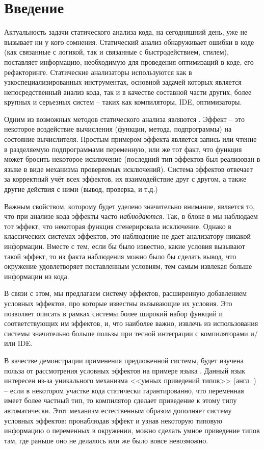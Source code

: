 \section*{Введение}

Актуальность задачи статического анализа кода, на сегодняшний день, уже не вызывает ни у кого сомнения. Статический анализ обнаруживает ошибки в коде (как связанные с логикой, так и связанные с быстродействием, стилем), поставляет информацию, необходимую для проведения оптимизаций в коде, его рефакторинге. Статические анализаторы используются как в узкоспециализированных инструментах, основной задачей которых является непосредственный анализ кода, так и в качестве составной части других, более крупных и серьезных систем -- таких как компиляторы, IDE, оптимизаторы.

Одним из возможных методов статического анализа являются . Эффект -- это некоторое воздействие вычисления (функции, метода, подпрограммы) на состояние вычислителя. Простым примером эффекта является запись или чтение в разделяемую подпрограммами переменную, или же тот факт, что функция может бросить некоторое исключение (последний тип эффектов был реализован в языке  в виде механизма проверяемых исключений). Система эффектов отвечает за корректный учёт всех эффектов, их взаимодействие друг с другом, а также другие действия с ними (вывод, проверка, и т.д.)

Важным свойством, которому будет уделено значительно внимание, является то, что при анализе кода эффекты часто \textit{наблюдаются}. Так, в блоке  в  мы наблюдаем тот эффект, что некоторая функция сгенерировала исключение. Однако в классических системах эффектов, это наблюдение не дает анализатору никакой информации. Вместе с тем, если бы было известно, какие условия вызывают такой эффект, то из факта наблюдения можно было бы сделать вывод, что окружение удовлетворяет поставленным условиям, тем самым извлекая больше информации из кода. 

В связи с этом, мы предлагаем систему эффектов, расширенную добавлением условных эффектов, про которые известны вызывающие их условия. Это позволяет описать в рамках системы более широкий набор функций и соответствующих им эффектов, и, что наиболее важно, извлечь из использования системы значительно больше пользы при тесной интеграции с компиляторами и/или IDE. 

В качестве демонстрации применения предложенной системы, будет изучена польза от рассмотрения условных эффектов на примере языка . Данный язык интересен из-за уникального механизма <<умных приведений типов>> (англ. ) -- если в некотором участке кода статически гарантированно, что переменная имеет более частный тип, то компилятор сделает приведение к этому типу автоматически. Этот механизм естественным образом дополняет систему условных эффектов: пронаблюдав эффект и узнав некоторую типовую информацию о переменных в окружении, можно сделать умное приведение типов там, где раньше оно не делалось или же было вовсе невозможно. 

